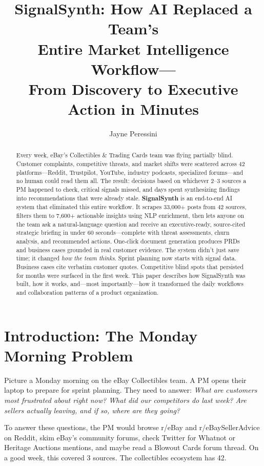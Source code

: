 \documentclass[11pt]{article}
\title{\textbf{SignalSynth: How AI Replaced a Team's\\Entire Market Intelligence Workflow---\\From Discovery to Executive Action in Minutes}}
\author{Jayne Peressini}
\affil{eBay Inc., Collectibles \& Trading Cards}
\date{}
\begin{document}
\maketitle

\begin{abstract}
Every week, eBay's Collectibles \& Trading Cards team was flying partially blind. Customer complaints, competitive threats, and market shifts were scattered across 42 platforms---Reddit, Trustpilot, YouTube, industry podcasts, specialized forums---and no human could read them all. The result: decisions based on whichever 2--3 sources a PM happened to check, critical signals missed, and days spent synthesizing findings into recommendations that were already stale. \textbf{SignalSynth} is an end-to-end AI system that eliminated this entire workflow. It scrapes 33,000+ posts from 42 sources, filters them to 7,600+ actionable insights using NLP enrichment, then lets anyone on the team ask a natural-language question and receive an executive-ready, source-cited strategic briefing in under 60 seconds---complete with threat assessments, churn analysis, and recommended actions. One-click document generation produces PRDs and business cases grounded in real customer evidence. The system didn't just save time; it changed \textit{how the team thinks}. Sprint planning now starts with signal data. Business cases cite verbatim customer quotes. Competitive blind spots that persisted for months were surfaced in the first week. This paper describes how SignalSynth was built, how it works, and---most importantly---how it transformed the daily workflows and collaboration patterns of a product organization.
\end{abstract}

\section{Introduction: The Monday Morning Problem}

Picture a Monday morning on the eBay Collectibles team. A PM opens their laptop to prepare for sprint planning. They need to answer: \textit{What are customers most frustrated about right now? What did our competitors do last week? Are sellers actually leaving, and if so, where are they going?}

To answer these questions, the PM would browse r/eBay and r/eBaySellerAdvice on Reddit, skim eBay's community forums, check Twitter for Whatnot or Heritage Auctions mentions, and maybe read a Blowout Cards forum thread. On a good week, this covered 3 sources. The collectibles ecosystem has 42.
\end{document}
